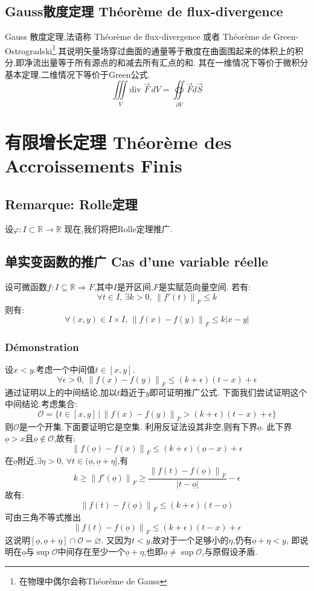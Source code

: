 \documentclass[12pt, a4paper, oneside]{ctexbook}
\newcommand{\R }{\mathbb{R}}%
\newcommand{\fai }{\varphi}%
\begin{document}
  \subsection{Gauss散度定理 Théorème de flux-divergence}
    Gauss 散度定理,法语称 Théorème de flux-divergence 或者 Théorème de Green-Ostrogradski\footnote{在物理中偶尔会称Théorème de Gauss}.其说明矢量场穿过曲面的通量等于散度在曲面围起来的体积上的积分,即净流出量等于所有源点的和减去所有汇点的和.
    其在一维情况下等价于微积分基本定理,二维情况下等价于Green公式.
    $$
      \iiint \limits_{V} \text{div } \vec{F}\,dV=\oiint\limits_{\partial V}\vec{F} d\vec{S}  
    $$

\section{有限增长定理 Théorème des Accroissements Finis}
\subsection{Remarque: Rolle定理}
  设$\fai: I\subset \R\rightarrow \R$
  现在,我们将把Rolle定理推广.
\subsection{单实变函数的推广 Cas d'une variable réelle}
  设可微函数$f:I\subseteq \R\Rightarrow F$,其中$I$是开区间,$F$是实赋范向量空间.
  若有:
  $$
  \forall t\in I,\,\exists k>0,\, \left\lVert f'(t)\right\rVert _F\leq k 
  $$
  则有:
  $$
  \forall(x,y)\in I\times I,\,\left\lVert f(x)-f(y)\right\rVert _F\leq k\left\lvert x-y\right\rvert 
  $$
  \subsubsection{Démonstration}
  设$x<y$.考虑一个中间值$t\in[x,y]$.
  $$
  \forall \epsilon>0,\,\left\lVert f(x)-f(y)\right\rVert _F\leq (k+\epsilon)(t-x)+\epsilon
  $$
  通过证明以上的中间结论,加以$t$趋近于$y$即可证明推广公式.
  下面我们尝试证明这个中间结论.考虑集合:
  $$
  \mathcal{O}=\{t\in[x,y]\,|\,\left\lVert f(x)-f(y)\right\rVert _F> (k+\epsilon)(t-x)+\epsilon \}
  $$
  则$\mathcal{O}$是一个开集.下面要证明它是空集.
  利用反证法设其非空,则有下界$\underline{o}$.
  此下界$\underline{o}>x$且$\underline{o}\notin\mathcal{O}$,故有:
  $$
  \left\lVert f(\underline{o})-f(x)\right\rVert _F\leq (k+\epsilon)(\underline{o}-x)+\epsilon
  $$
  在$\underline{o}$附近,$  \exists \eta >0 ,\,\forall t\in(\underline{o},\underline{o}+\eta]$,有
  $$
    k\ge \left\lVert f'(\underline{o})\right\rVert _F\ge\frac{\left\lVert f(t)-f(\underline{o})\right\rVert _F}{\left\lvert t-\underline{o} \right\rvert} -\epsilon
  $$
  故有:
  $$
    \left\lVert f(t)-f(\underline{o})\right\rVert _F\leq (k+\epsilon)(t-\underline{o})
  $$
  可由三角不等式推出
  $$
    \left\lVert f(t)-f(\underline{o})\right\rVert _F\leq (k+\epsilon)(t-x)+\epsilon
  $$
  这说明$[\underline{o},\underline{o}+\eta]\cap\mathcal{O}=\varnothing$.
  又因为$t<y$,故对于一个足够小的$\eta$,仍有$\underline{o}+\eta<y $,
  即说明在$\underline{o} $与$\sup \mathcal{O}$中间存在至少一个$\underline{o}+\eta$,也即$\underline{o}\neq \sup \mathcal{O}$,与原假设矛盾.
\end{document}
